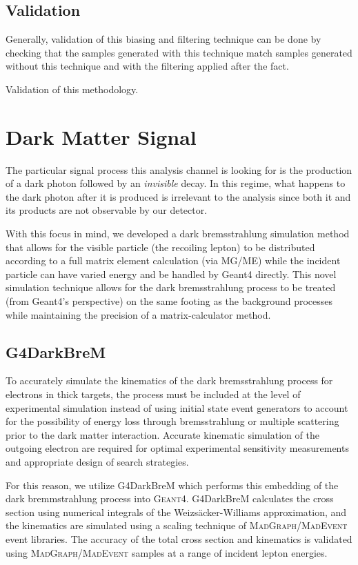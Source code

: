 \subsection{Validation}
Generally, validation of this biasing and filtering technique can be done by checking that
the samples generated with this technique match samples generated without this technique
and with the filtering applied after the fact.

Validation of this methodology. 

\section{Dark Matter Signal}
The particular signal process this analysis channel is looking for is the production of a dark
photon followed by an \emph{invisible} decay. In this regime, what happens to the dark photon after
it is produced is irrelevant to the analysis since both it and its products are not observable by
our detector.

With this focus in mind, we developed a dark bremsstrahlung simulation method that allows for the
visible particle (the recoiling lepton) to be distributed according to a full matrix element
calculation (via MG/ME) while the incident particle can have varied energy and be handled by Geant4
directly. This novel simulation technique allows for the dark bremsstrahlung process to be treated
(from Geant4's perspective) on the same footing as the background processes while maintaining the
precision of a matrix-calculator method.

\subsection{G4DarkBreM}
To accurately simulate the kinematics of the dark bremsstrahlung process for electrons in thick
targets, the process must be included at the level of experimental simulation instead of using
initial state event generators to account for the possibility of energy loss through bremsstrahlung
or multiple scattering prior to the dark matter interaction. Accurate kinematic simulation of the
outgoing electron are required for optimal experimental sensitivity measurements and appropriate
design of search strategies.

For this reason, we utilize G4DarkBreM \cite{g4darkbrem} which performs this embedding of the dark
bremmstrahlung process into \textsc{Geant}4. G4DarkBreM calculates the cross section using
numerical integrals of the Weizs\"{a}cker-Williams approximation, and the kinematics are simulated
using a scaling technique of \textsc{MadGraph/MadEvent} event libraries. The accuracy of the total
cross section and kinematics is validated using \textsc{MadGraph/MadEvent} samples at a range of
incident lepton energies.

